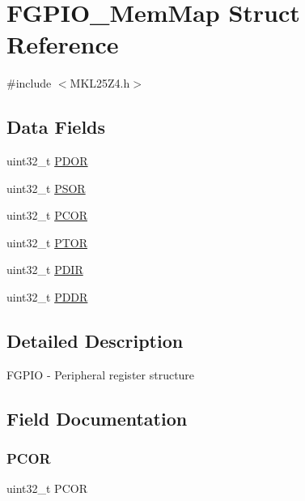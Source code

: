 \hypertarget{struct_f_g_p_i_o___mem_map}{}\section{F\+G\+P\+I\+O\+\_\+\+Mem\+Map Struct Reference}
\label{struct_f_g_p_i_o___mem_map}


{\ttfamily \#include $<$M\+K\+L25\+Z4.\+h$>$}

\subsection*{Data Fields}
\begin{DoxyCompactItemize}
\item 
uint32\+\_\+t \hyperlink{struct_f_g_p_i_o___mem_map_a6d8857d2ca1928bcedd1a83e93946aef}{P\+D\+OR}
\item 
uint32\+\_\+t \hyperlink{struct_f_g_p_i_o___mem_map_a2fc5ff57bdc9e1de4233930468cbf5e3}{P\+S\+OR}
\item 
uint32\+\_\+t \hyperlink{struct_f_g_p_i_o___mem_map_adba03f40e10aed5fc14d7ee0698aa6f2}{P\+C\+OR}
\item 
uint32\+\_\+t \hyperlink{struct_f_g_p_i_o___mem_map_a2a8b6ad3b774b37fcdf9a0f04f56e43b}{P\+T\+OR}
\item 
uint32\+\_\+t \hyperlink{struct_f_g_p_i_o___mem_map_a4c83a78320344c89b1663969a7c5d749}{P\+D\+IR}
\item 
uint32\+\_\+t \hyperlink{struct_f_g_p_i_o___mem_map_a37eee18eef001998403709bf78f4a33d}{P\+D\+DR}
\end{DoxyCompactItemize}


\subsection{Detailed Description}
F\+G\+P\+IO -\/ Peripheral register structure 

\subsection{Field Documentation}
\mbox{\label{struct_f_g_p_i_o___mem_map_adba03f40e10aed5fc14d7ee0698aa6f2}} 
\subsubsection{\texorpdfstring{P\+C\+OR}{PCOR}}
{\footnotesize\ttfamily uint32\+\_\+t P\+C\+OR}

